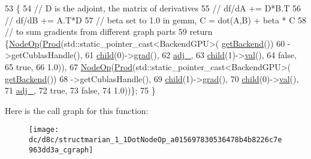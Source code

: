 \begin{DoxyCode}
53                         \{
54     \textcolor{comment}{// D is the adjoint, the matrix of derivatives}
55     \textcolor{comment}{// df/dA += D*B.T}
56     \textcolor{comment}{// df/dB += A.T*D}
57     \textcolor{comment}{// beta set to 1.0 in gemm, C = dot(A,B) + beta * C}
58     \textcolor{comment}{// to sum gradients from different graph parts}
59     \textcolor{keywordflow}{return} \{\hyperlink{definitions_8h_a48f5ac3fc4e5043f1ebfed786912842c}{NodeOp}(\hyperlink{namespacemarian_a509f2975b7c8da70df1cd56de5d3e79e}{Prod}(std::static\_pointer\_cast<BackendGPU>(
      \hyperlink{classmarian_1_1Node_a4aa5aa482c70595fa5d43c1fbabf5c18}{getBackend}())
60                             ->getCublasHandle(),
61                         \hyperlink{classmarian_1_1Node_a71a9c8ad6ba12d421fa97222d74a90b9}{child}(0)->\hyperlink{classmarian_1_1Node_a0497d2c3515385212b1086f8b8502826}{grad}(),
62                         \hyperlink{classmarian_1_1Node_a13a0badd98010fdd2536cb5d055ade5a}{adj\_},
63                         \hyperlink{classmarian_1_1Node_a71a9c8ad6ba12d421fa97222d74a90b9}{child}(1)->\hyperlink{classmarian_1_1Node_a0df86f2ff4a169111d6ba0865e6fd935}{val}(),
64                         \textcolor{keyword}{false},
65                         \textcolor{keyword}{true},
66                         1.0)),
67             \hyperlink{definitions_8h_a48f5ac3fc4e5043f1ebfed786912842c}{NodeOp}(\hyperlink{namespacemarian_a509f2975b7c8da70df1cd56de5d3e79e}{Prod}(std::static\_pointer\_cast<BackendGPU>(
      \hyperlink{classmarian_1_1Node_a4aa5aa482c70595fa5d43c1fbabf5c18}{getBackend}())
68                             ->getCublasHandle(),
69                         \hyperlink{classmarian_1_1Node_a71a9c8ad6ba12d421fa97222d74a90b9}{child}(1)->\hyperlink{classmarian_1_1Node_a0497d2c3515385212b1086f8b8502826}{grad}(),
70                         \hyperlink{classmarian_1_1Node_a71a9c8ad6ba12d421fa97222d74a90b9}{child}(0)->\hyperlink{classmarian_1_1Node_a0df86f2ff4a169111d6ba0865e6fd935}{val}(),
71                         \hyperlink{classmarian_1_1Node_a13a0badd98010fdd2536cb5d055ade5a}{adj\_},
72                         \textcolor{keyword}{true},
73                         \textcolor{keyword}{false},
74                         1.0))\};
75   \}
\end{DoxyCode}


Here is the call graph for this function\+:
\nopagebreak
\begin{figure}[H]
\begin{center}
\leavevmode
\texttt{[image: dc/d8c/structmarian\_1\_1DotNodeOp\_a015697830536478b4b8226c7e963dd3a\_cgraph]}
\end{center}
\end{figure}




